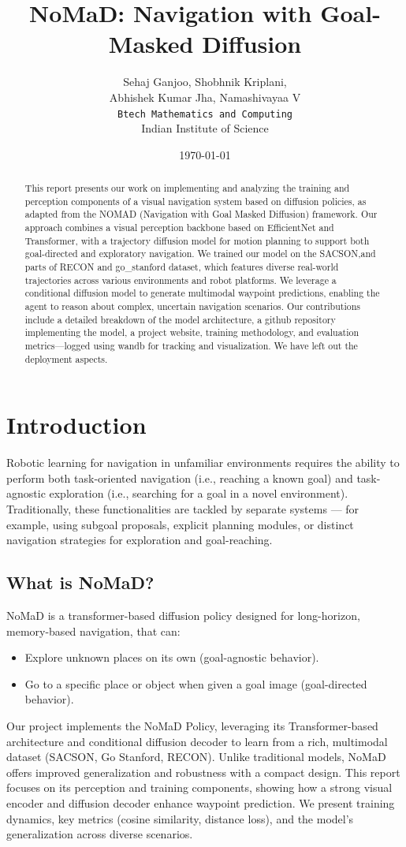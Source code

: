 \documentclass[12pt]{article}
\title{NoMaD: \textbf{N}avigati\textbf{o}n with Goal-\textbf{Ma}sked \textbf{D}iffusion}
\author{Sehaj Ganjoo, Shobhnik Kriplani, \\ Abhishek Kumar Jha, Namashivayaa V \\ \texttt{Btech Mathematics and Computing} \\ Indian Institute of Science}
\date{\today}
\begin{document}
\maketitle

\begin{abstract}
This report presents our work on implementing and analyzing the training and perception components of a visual navigation system based on diffusion policies, as adapted from the NOMAD (Navigation with Goal Masked Diffusion) framework. 
Our approach combines a visual perception backbone based on EfficientNet and Transformer, with a trajectory diffusion model for motion planning to support both goal-directed and exploratory navigation. We trained our model on the SACSON,and parts of RECON and go\_stanford dataset, which features diverse real-world trajectories across various environments and robot platforms. 
We leverage a conditional diffusion model to generate multimodal waypoint predictions, enabling the agent to reason about complex, uncertain navigation scenarios. Our contributions include a detailed breakdown of the model architecture, a github repository implementing the model, a project website, training methodology, and evaluation metrics—logged using wandb for tracking and visualization. 
We have left out the deployment aspects.
\end{abstract}


\section{Introduction}
Robotic learning for navigation in unfamiliar environments requires the ability to perform both task-oriented navigation (i.e., reaching a known goal) and task-agnostic exploration (i.e., searching for a goal in a novel environment). Traditionally, these functionalities are tackled by separate systems — for example, using subgoal proposals, explicit planning modules, or distinct navigation strategies for exploration and goal-reaching.

\subsection*{What is NoMaD?}
NoMaD is a transformer-based diffusion policy designed for long-horizon, memory-based navigation, that can:
\begin{itemize}
    \item Explore unknown places on its own (goal-agnostic behavior).
    \item Go to a specific place or object when given a goal image (goal-directed behavior).
\end{itemize}
Our project implements the NoMaD Policy, leveraging its Transformer-based architecture and conditional diffusion decoder to learn from a rich, multimodal dataset (SACSON, Go Stanford, RECON). Unlike traditional models, NoMaD offers improved generalization and robustness with a compact design. This report focuses on its perception and training components, showing how a strong visual encoder and diffusion decoder enhance waypoint prediction. We present training dynamics, key metrics (cosine similarity, distance loss), and the model's generalization across diverse scenarios.
\end{document}
